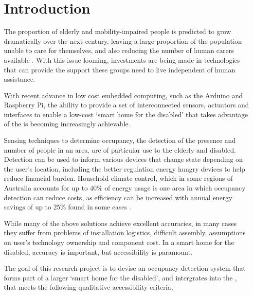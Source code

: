 \documentclass[../thesis/thesis.tex]{subfiles}
\begin{document}
\chapter{Introduction}
 
The proportion of elderly and mobility-impaired people is predicted to grow dramatically over the next century, leaving a large proportion of the population unable to care for themselves, and also reducing the number of human carers available \cite{chan2009smart}. With this issue looming, investments are being made in technologies that can provide the support these groups need to live independent of human assistance. 

With recent advance in low cost embedded computing, such as the Arduino and Raspberry Pi, the ability to provide a set of interconnected sensors, actuators and interfaces to enable a low-cost `smart home for the disabled' that takes advantage of the \iot is becoming increasingly achievable.

Sensing techniques to determine occupancy, the detection of the presence and number of people in an area, are of particular use to the elderly and disabled. Detection can be used to inform various devices that change state depending on the user's location, including the better regulation energy hungry devices to help reduce financial burden. Household climate control, which in some regions of Australia accounts for up to 40\% of energy usage \cite{abs4602} is one area in which occupancy detection can reduce costs, as efficiency can be increased with annual energy savings of up to 25\% found in some cases \cite{beltran2013thermosense}.
 
While many of the above solutions achieve excellent accuracies, in many cases they suffer from problems of installation logistics, difficult assembly, assumptions on user's technology ownership and component cost. In a smart home for the disabled, accuracy is important, but accessibility is paramount.

The goal of this research project is to devise an occupancy detection system that forms part of a larger `smart home for the disabled', and intergrates into the \iot, that meets the following qualitative accessibility criteria;
\end{document}
